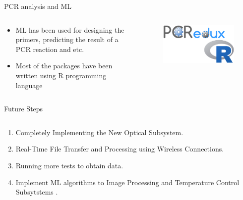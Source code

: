 \documentclass[UKenglish, aspectratio = 169]{beamer}
\begin{document}
\begin{frame}{PCR analysis and ML}
	\begin{columns}
		\begin{column}[T]{0.5\textwidth}
			\vspace*{4ex}
			\begin{itemize}
				\item ML has been used for designing the primers, predicting the result of a PCR reaction and etc.
				\item Most of the packages have been written using R programming language
			\end{itemize}
		\end{column}
		\begin{column}{0.5\textwidth}
			\begin{figure}
				\centering
				\includegraphics[scale=0.45]{figs/Rlogo.png}
				\caption{\tiny{}}
			\end{figure}
		\end{column}
	\end{columns}
\end{frame}

\begin{frame}{Future Steps}
	\begin{columns}
		\begin{column}[T]{0.8\textwidth}
			\vspace*{4ex}
			\begin{enumerate}
				\item Completely Implementing the New Optical Subsystem.
				\item Real-Time File Transfer and Processing using Wireless Connections.
				\item Running more tests to obtain data.
				\item Implement ML algorithms to Image Processing and Temperature Control Subsytstems .
			\end{enumerate}
		\end{column}
		\begin{column}{0.2\textwidth}
		\end{column}
	\end{columns}
\end{frame}
\end{document}
